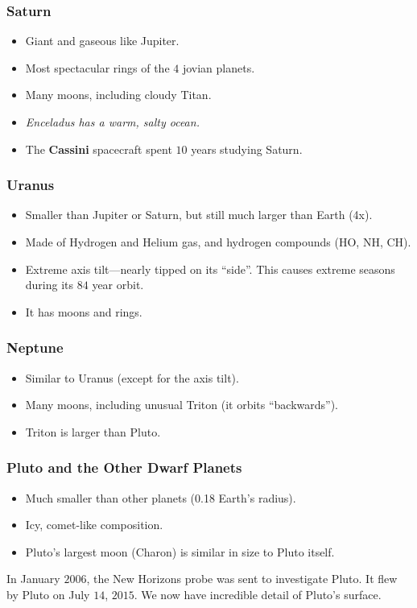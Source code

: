 \documentclass[class=article, crop=false]{standalone}
\begin{document}
  \subsubsection{Saturn}
  \begin{itemize}
    \item Giant and gaseous like Jupiter.
    \item Most spectacular rings of the $4$ jovian planets.
    \item Many moons, including cloudy Titan.
    \item \emph{Enceladus has a warm, salty ocean.}
    \item The \textbf{Cassini} spacecraft spent $10$ years studying Saturn.
  \end{itemize}
  \subsubsection{Uranus}
  \begin{itemize}
    \item Smaller than Jupiter or Saturn, but still much larger than Earth (4x).
    \item Made of Hydrogen and Helium gas, and hydrogen compounds (HO, NH, CH).
    \item Extreme axis tilt---nearly tipped on its ``side''. This causes extreme seasons during its $84$ year orbit.
    \item It has moons and rings.
  \end{itemize}
  \subsubsection{Neptune}
  \begin{itemize}
    \item Similar to Uranus (except for the axis tilt).
    \item Many moons, including unusual Triton (it orbits ``backwards'').
    \item Triton is larger than Pluto.
  \end{itemize}
  \subsubsection{Pluto and the Other Dwarf Planets}
  \begin{itemize}
    \item Much smaller than other planets (0.18 Earth's radius).
    \item Icy, comet-like composition.
    \item Pluto's largest moon (Charon) is similar in size to Pluto itself.
  \end{itemize}
  In January $2006$, the New Horizons probe was sent to investigate Pluto. It flew by Pluto on July $14$, $2015$. We now have incredible detail of Pluto's surface.
\end{document}
